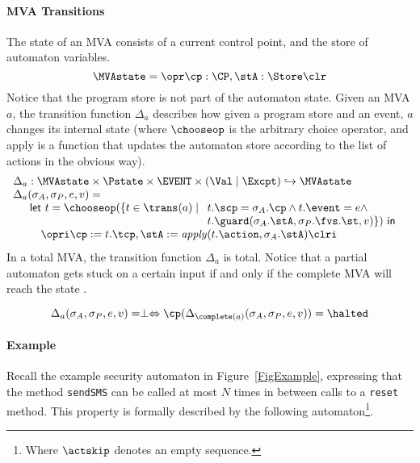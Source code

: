\paragraph{MVA Transitions} The state of an MVA consists of a current control
point, and the store of automaton variables.
\[
\MVAstate = \opr \cp : \CP, \stA : \Store \clr
\]
Notice that the program store is not part of the automaton
state. Given an MVA \(a\), the transition function \(\Delta_a\)
describes how given a program store and an event, \(a\) changes its
internal state (where \(\chooseop\) is the arbitrary choice operator,
and \textsf{apply} is a function that updates the automaton store
according to the list of actions in the obvious way).
\[
\begin{array}{l}
\Delta_a  :  \MVAstate \times \Pstate \times \EVENT \times (\Val \mid
\Excpt) \hookrightarrow
\MVAstate\\
\Delta_a(\sigma_A, \sigma_P, e, v) = \\
\quad
\begin{array}[t]{l}
\mathsf{let\ }t = \chooseop(\{t\in \trans(a)\mid
  \begin{array}[t]{l}
     t.\scp = \sigma_A.\cp \wedge t.\event = e \wedge \\
     t.\guard(\sigma_A.\stA, \sigma_P.\fvs.\st, v)\}) \mathsf{\ in}
  \end{array}\\
\quad \opri \cp := t.\tcp, \stA := \mathit{apply}(t.\action,
\sigma_A.\stA) \clri
\end{array}

\end{array}
\]
In a total MVA, the transition function \(\Delta_a\) is total. Notice
that a partial automaton gets stuck on a certain input if and only if the
complete MVA will reach the state \halted.

\begin{equation}\label{MVAcompletionProp}
\Delta_a(\sigma_A, \sigma_P, e, v) = \perp \Leftrightarrow
\cp (\Delta_{\complete(a)}(\sigma_A, \sigma_P, e, v)) = \halted
\end{equation}


\paragraph{Example}
Recall the example security automaton in Figure~\ref{FigExample},
expressing that the method \texttt{sendSMS} can
be called at most \(N\) times in between calls to a \texttt{reset}
method. This property is formally described by the following
automaton\footnote{Where \(\actskip\) denotes an empty sequence.}.

